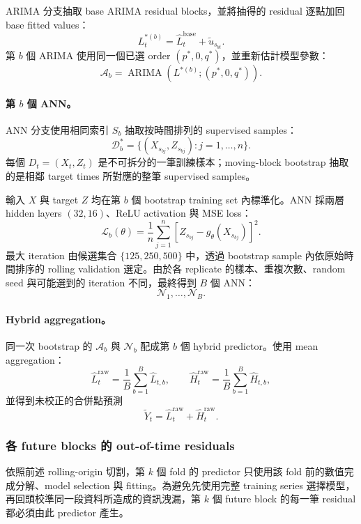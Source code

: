 {ARIMA 分支抽取 base ARIMA residual blocks，並將抽得的 residual 逐點加回 base fitted values：
\[
    L_t^{\ast(b)}
    =\widehat L_t^{\mathrm{base}}+\widetilde u_{s_{bt}}.
\]
第 $b$ 個 ARIMA 使用同一個已選 order $(p^\ast,0,q^\ast)$，並重新估計模型參數：
\[
    \mathcal A_b
    =\operatorname{ARIMA}\!\left(L^{\ast(b)};(p^\ast,0,q^\ast)\right).
\]

\paragraph{第 $b$ 個 ANN。}


ANN 分支使用相同索引 $S_b$ 抽取按時間排列的 supervised samples：
\[
    \mathcal D_b^\ast=\{(X_{s_{bj}},Z_{s_{bj}}):j=1,\ldots,n\}.
\]
每個 $D_t=(X_t,Z_t)$ 是不可拆分的一筆訓練樣本；moving-block bootstrap 抽取的是相鄰 target times 所對應的整筆 supervised samples。

輸入 $X$ 與 target $Z$ 均在第 $b$ 個 bootstrap training set 內標準化。ANN 採兩層 hidden layers $(32,16)$、ReLU activation 與 MSE loss：
\[
    \mathcal L_b(\theta)
    =\frac{1}{n}\sum_{j=1}^{n}
    \left[Z_{s_{bj}}-g_{\theta}(X_{s_{bj}})\right]^2.
\]
最大 iteration 由候選集合 $\{125,250,500\}$ 中，透過 bootstrap sample 內依原始時間排序的 rolling validation 選定。由於各 replicate 的樣本、重複次數、random seed 與可能選到的 iteration 不同，最終得到 $B$ 個 ANN：
\[
    \mathcal N_1,\ldots,\mathcal N_B.
\]

\paragraph{Hybrid aggregation。}


同一次 bootstrap 的 $\mathcal A_b$ 與 $\mathcal N_b$ 配成第 $b$ 個 hybrid predictor。使用 mean aggregation：
\[
    \widehat L_t^{\mathrm{raw}}
    =\frac{1}{B}\sum_{b=1}^{B}\widehat L_{t,b},
    \qquad
    \widehat H_t^{\mathrm{raw}}
    =\frac{1}{B}\sum_{b=1}^{B}\widehat H_{t,b},
\]
並得到未校正的合併點預測
\[
    \widetilde Y_t
    =\widehat L_t^{\mathrm{raw}}+\widehat H_t^{\mathrm{raw}}.
\]

\subsubsection*{各 future blocks 的 out-of-time residuals}

依照前述 rolling-origin 切割，第 $k$ 個 fold 的 predictor 只使用該 fold 前的數值完成分解、model selection 與 fitting。為避免先使用完整 training series 選擇模型，再回頭校準同一段資料所造成的資訊洩漏，第 $k$ 個 future block 的每一筆 residual 都必須由此 predictor 產生。

}
